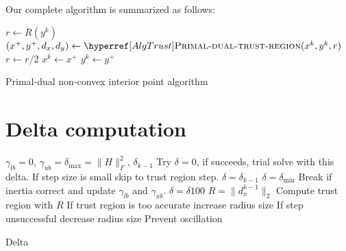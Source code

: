 \documentclass{article}
\begin{document}
Our complete algorithm is summarized as follows:

\begin{algorithm}[H]
\begin{algorithmic}\label{AlgMain}
\State $r \gets R (y^k)$
\Repeat
\State $(x^{+}, y^{+}, d_{x}, d_{y}) \gets \callAlgTrust{x^k, y^k, r}$
\State {}
\EndIf
\EndIf
\State $r \gets r / 2$
\State $x^{k} \gets x^{+}$
\State $y^k \gets y^{+}$
\EndFor
\EndFunction
\end{algorithmic}
\caption{Primal-dual non-convex interior point algorithm}
\end{algorithm}


\section{Delta computation}

\begin{algorithm}[H]
\begin{algorithmic}
\State $\gamma_{lb} = 0$, $\gamma_{ub} = \delta_{\max} = \| H \|^2_{F}$, $\delta_{k-1}$ 
\State Try $\delta = 0$, if succeeds, trial solve with this delta. If step size is small skip to trust region step.
\State $\delta = \delta_{k-1}$
\State $\delta = \delta_{\min}$
\EndIf
{}
\State Break if inertia correct and update $\gamma_{lb}$ and $\gamma_{ub}$.
\State $\delta = \delta 100$
\EndFor
\State {}
\State $R = \| d_{x}^{k-1} \|_{2}$
\State Compute trust region with $R$
\State If trust region is too accurate increase radius size
\State If step unsuccessful decrease radius size
\State Prevent oscillation
\EndFor
\end{algorithmic}
\caption{Delta}
\end{algorithm}
\end{document}
